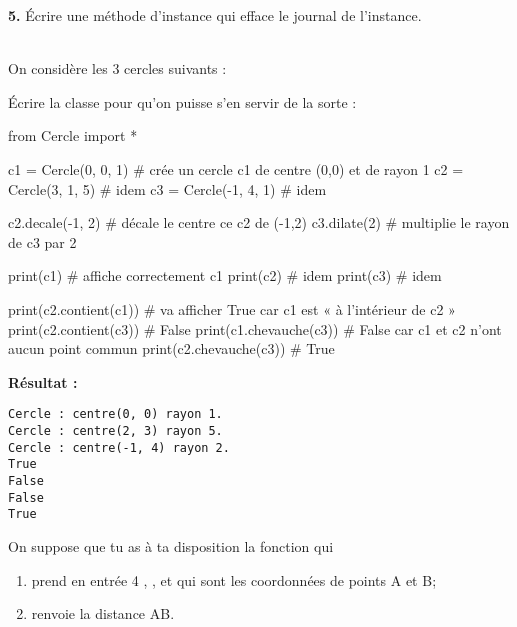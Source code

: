 \documentclass[a4paper,10pt,french]{book}
\begin{document}
\medskip

\textbf{5.} \'Ecrire une méthode d'instance  qui efface le journal de l'instance.\\

\newpage

\\ 

On considère les 3 cercles suivants :

\begin{center}
\def\uscl{.5}
\end{center}

\'Ecrire la classe  pour qu'on puisse s'en servir de la sorte :

\begin{pythoncode}
from Cercle import *

c1 = Cercle(0, 0, 1)  # crée un cercle c1 de centre (0,0) et de rayon 1
c2 = Cercle(3, 1, 5)  # idem
c3 = Cercle(-1, 4, 1)  # idem

c2.decale(-1, 2)  # décale le centre ce c2 de (-1,2)
c3.dilate(2)  # multiplie le rayon de c3 par 2

print(c1)  # affiche correctement c1
print(c2)  # idem
print(c3)  # idem

print(c2.contient(c1))  # va afficher True car c1 est « à l'intérieur de c2 »
print(c2.contient(c3))  # False
print(c1.chevauche(c3))  # False car c1 et c2 n'ont aucun point commun
print(c2.chevauche(c3))  # True
\end{pythoncode}

\textbf{Résultat :}
\begin{verbatim}
Cercle : centre(0, 0) rayon 1.
Cercle : centre(2, 3) rayon 5.
Cercle : centre(-1, 4) rayon 2.
True
False
False
True
\end{verbatim}

On suppose que tu as à ta disposition la fonction  qui
\begin{enumerate}[\textbullet]
	\item 	prend en entrée 4   , ,  et  qui sont les coordonnées de points A et B;
	\item 	renvoie la distance AB. 	
\end{enumerate}
\end{document}
